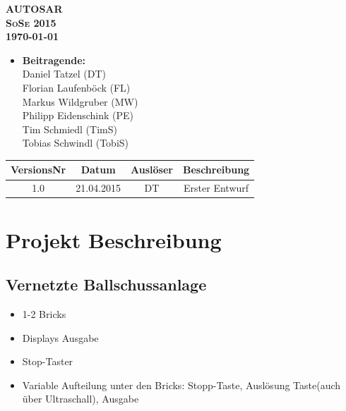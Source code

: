 \documentclass[a4paper,11pt]{scrreprt}
\begin{document}
\begin{titlepage}

\vspace*{\fill}
  \begin{center}

\huge \bfseries AUTOSAR \\[2.5cm]

\textsc{\Large SoSe 2015}\\[0.5cm]

\large \today

\vfill

  \end{center}
\end{titlepage}

\begin{itemize}
\item[] \textbf{\large Beitragende:}\\
Daniel Tatzel (DT)\\
Florian Laufenböck (FL)\\
Markus Wildgruber (MW)\\
Philipp Eidenschink (PE)\\
Tim Schmiedl (TimS)\\
Tobias Schwindl (TobiS)
\end{itemize}

\bigskip

\begin{table}[!h]
 	\centering
	\begin{tabular}{|c|c|c|c|}
	\hline
	\textbf{VersionsNr} &  \textbf{Datum} & \textbf{Auslöser} & \textbf{Beschreibung} \\
	\hline
	1.0 & 21.04.2015 & DT & Erster Entwurf \\
	\hline
	\end{tabular}

\end{table}



\chapter{Projekt Beschreibung}

\section{Vernetzte Ballschussanlage}

\begin{itemize}
 \item 1-2 Bricks
 \item Displays Ausgabe
 \item Stop-Taster
 \item Variable Aufteilung unter den Bricks: Stopp-Taste, Auslösung Taste(auch über Ultraschall), Ausgabe
\end{itemize}
\end{document}
